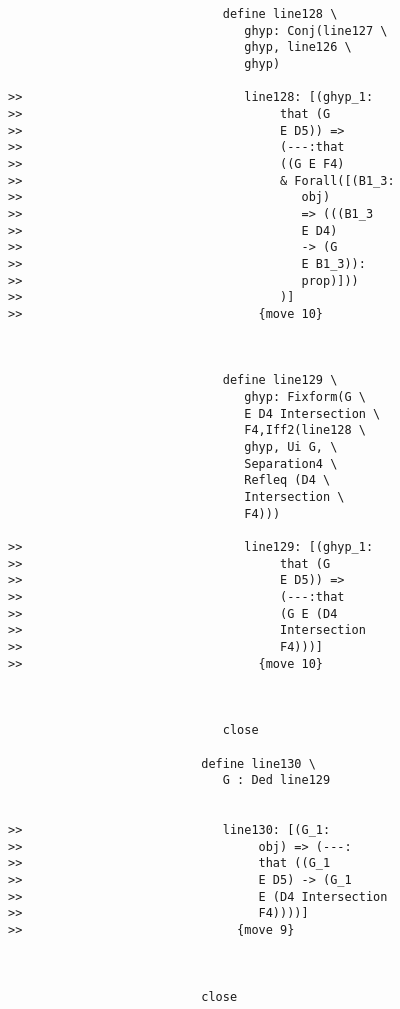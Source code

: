 \documentclass[12pt]{article}
\begin{document}
\begin{verbatim}
                              define line128 \
                                 ghyp: Conj(line127 \
                                 ghyp, line126 \
                                 ghyp)

>>                               line128: [(ghyp_1:
>>                                    that (G
>>                                    E D5)) =>
>>                                    (---:that
>>                                    ((G E F4)
>>                                    & Forall([(B1_3:
>>                                       obj)
>>                                       => (((B1_3
>>                                       E D4)
>>                                       -> (G
>>                                       E B1_3)):
>>                                       prop)]))
>>                                    )]
>>                                 {move 10}



                              define line129 \
                                 ghyp: Fixform(G \
                                 E D4 Intersection \
                                 F4,Iff2(line128 \
                                 ghyp, Ui G, \
                                 Separation4 \
                                 Refleq (D4 \
                                 Intersection \
                                 F4)))

>>                               line129: [(ghyp_1:
>>                                    that (G
>>                                    E D5)) =>
>>                                    (---:that
>>                                    (G E (D4
>>                                    Intersection
>>                                    F4)))]
>>                                 {move 10}



                              close

                           define line130 \
                              G : Ded line129


>>                            line130: [(G_1:
>>                                 obj) => (---:
>>                                 that ((G_1
>>                                 E D5) -> (G_1
>>                                 E (D4 Intersection
>>                                 F4))))]
>>                              {move 9}



                           close


\end{verbatim}
\end{document}
